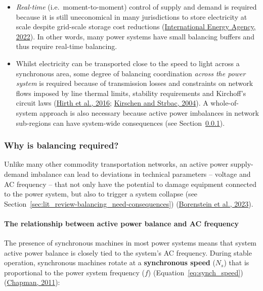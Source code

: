 \documentclass[12pt,a4paper,]{report}
\providecommand{\tightlist}{%
  \setlength{\itemsep}{0pt}\setlength{\parskip}{0pt}}
\begin{document}
\begin{itemize}
\tightlist
\item
  \emph{Real-time} (i.e.~moment-to-moment) control of supply and demand
  is required because it is still uneconomical in many jurisdictions to
  store electricity at scale despite grid-scale storage cost reductions
  (\protect\hyperlink{ref-internationalenergyagencyGridScaleStorage2022}{International
  Energy Agency, 2022}). In other words, many power systems have small
  balancing buffers and thus require real-time balancing.
\item
  Whilst electricity can be transported close to the speed to light
  across a synchronous area, some degree of balancing coordination
  \emph{across the power system} is required because of transmission
  losses and constraints on network flows imposed by line thermal
  limits, stability requirements and Kirchoff's circuit laws
  (\protect\hyperlink{ref-hirthWhyWindNot2016a}{Hirth et al., 2016};
  \protect\hyperlink{ref-kirschenFundamentalsPowerSystem2004}{Kirschen
  and Strbac, 2004}). A whole-of-system approach is also necessary
  because active power imbalances in network sub-regions can have
  system-wide consequences (see
  Section~\ref{sec:lit_review-balancing_need}).
\end{itemize}

\hypertarget{sec:lit_review-balancing_need}{%
\subsubsection{Why is balancing
required?}\label{sec:lit_review-balancing_need}}

Unlike many other commodity transportation networks, an active power
supply-demand imbalance can lead to deviations in technical parameters
-- voltage and AC frequency -- that not only have the potential to
damage equipment connected to the power system, but also to trigger a
system collapse (see
Section~\ref{sec:lit_review-balancing_need-consequences})
(\protect\hyperlink{ref-borensteinEconomicsElectricityReliability2023}{Borenstein
et al., 2023}).

\hypertarget{sec:lit_review-balancing_need-frequency}{%
\paragraph{The relationship between active power balance and AC
frequency}\label{sec:lit_review-balancing_need-frequency}}

The presence of synchronous machines in most power systems means that
system active power balance is closely tied to the system's AC
frequency. During stable operation, synchronous machines rotate at a
\textbf{synchronous speed} (\(N_s\)) that is proportional to the power
system frequency (\(f\)) (Equation~\ref{eq:synch_speed})
(\protect\hyperlink{ref-chapmanElectricMachineryFundamentals2011}{Chapman,
2011}):
\end{document}
